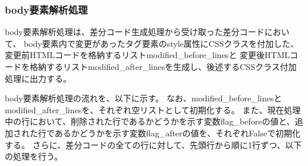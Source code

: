 \subsubsection{body要素解析処理}\label{subsubsec: body_analysis}
body要素解析処理は、差分コード生成処理から受け取った差分コードにおいて、
body要素内で変更があったタグ要素のstyle属性にCSSクラス\cite{CssSelector}を付加した、変更前HTMLコードを格納するリストmodified\_before\_linesと
変更後HTMLコードを格納するリストmodified\_after\_linesを生成し、後述するCSSクラス付加処理に出力する。
\par
body要素解析処理の流れを、以下に示す。
なお、modified\_before\_linesとmodified\_after\_linesを、それぞれ空リストとして初期化する。
また、現在処理中の行において、削除された行であるかどうかを示す変数flag\_beforeの値と、追加された行であるかどうかを示す変数flag\_afterの値を、それぞれFalseで初期化する。
さらに、差分コードの全ての行に対して、先頭行から順に1行ずつ、以下の処理を行う。
